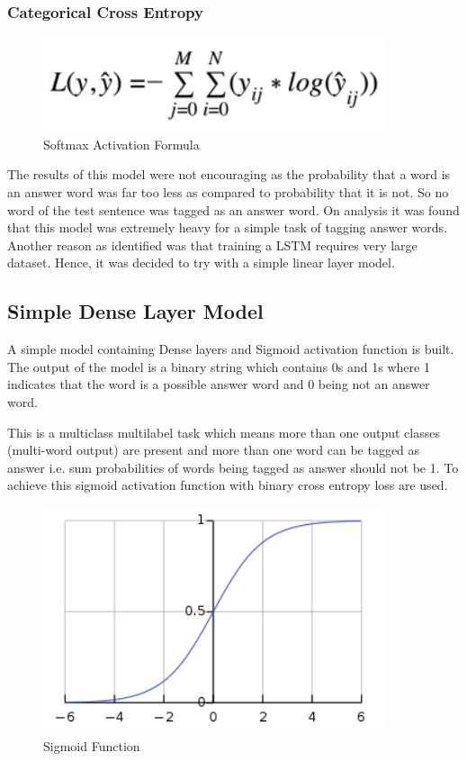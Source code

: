 \subsubsection{Categorical Cross Entropy}

\begin{figure}
	\caption{Softmax Activation Formula}
	\centering\includegraphics[width=10cm]{6.png}
\end{figure}

The results of this model were not encouraging as the probability that a word is
an answer word was far too less as compared to probability that it is not. So no
word of the test sentence was tagged as an answer word. On analysis it was found
that this model  was extremely heavy for a simple task of tagging answer words.
Another reason as identified was that training a LSTM requires very large
dataset. Hence, it was decided to try with a simple linear layer model.

\subsection{Simple Dense Layer Model}
A simple model containing Dense layers and Sigmoid activation function is built.
The output of the model is a binary string which contains 0s and 1s where 1
indicates that the word is a possible answer word and 0 being not an answer
word.

This is a multiclass multilabel task which means more than one output classes
(multi-word output) are present and more than one word can be tagged as answer
i.e. sum probabilities of words being tagged as answer should not be 1. To
achieve this sigmoid activation function with binary cross entropy loss are
used.

\begin{figure}
	\caption{Sigmoid Function}
	\centering\includegraphics[width=10cm]{7.png}
\end{figure}

